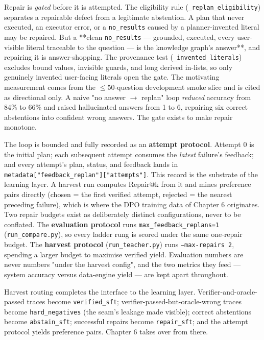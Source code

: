 Repair is \emph{gated} before it is attempted. The eligibility rule (\texttt{\_replan\_eligibility}) separates a repairable defect from a legitimate abstention. A plan that never executed, an executor error, or a \texttt{no\_results} caused by a planner-invented literal may be repaired. But a **clean \texttt{no\_results} --- grounded, executed, every user-visible literal traceable to the question --- is the knowledge graph's answer**, and repairing it is answer-shopping. The provenance test (\texttt{\_invented\_literals}) excludes bound values, invisible guards, and long derived in-lists, so only genuinely invented user-facing literals open the gate. The motivating measurement comes from the $\leq$50-question development smoke slice and is cited as directional only. A naive "no answer $\rightarrow$ replan" loop \emph{reduced} accuracy from 84\% to 66\% and raised hallucinated answers from 1 to 6, repairing six correct abstentions into confident wrong answers. The gate exists to make repair monotone.

The loop is bounded and fully recorded as an \textbf{attempt protocol}. Attempt 0 is the initial plan; each subsequent attempt consumes the \emph{latest} failure's feedback; and every attempt's plan, status, and feedback lands in \texttt{metadata["feedback\_replan"]["attempts"]}. This record is the substrate of the learning layer. A harvest run computes Repair@k from it and mines preference pairs directly (chosen = the first verified attempt, rejected = the nearest preceding failure), which is where the DPO training data of Chapter 6 originates. Two repair budgets exist as deliberately distinct configurations, never to be conflated. The \textbf{evaluation protocol} runs \texttt{max\_feedback\_replans=1} (\texttt{run\_compare.py}), so every ladder rung is scored under the same one-repair budget. The \textbf{harvest protocol} (\texttt{run\_teacher.py}) runs \texttt{--max-repairs 2}, spending a larger budget to maximise verified yield. Evaluation numbers are never numbers "under the harvest config", and the two metrics they feed --- system accuracy versus data-engine yield --- are kept apart throughout.

Harvest routing completes the interface to the learning layer. Verifier-and-oracle-passed traces become \texttt{verified\_sft}; verifier-passed-but-oracle-wrong traces become \texttt{hard\_negatives} (the seam's leakage made visible); correct abstentions become \texttt{abstain\_sft}; successful repairs become \texttt{repair\_sft}; and the attempt protocol yields preference pairs. Chapter 6 takes over from there.

